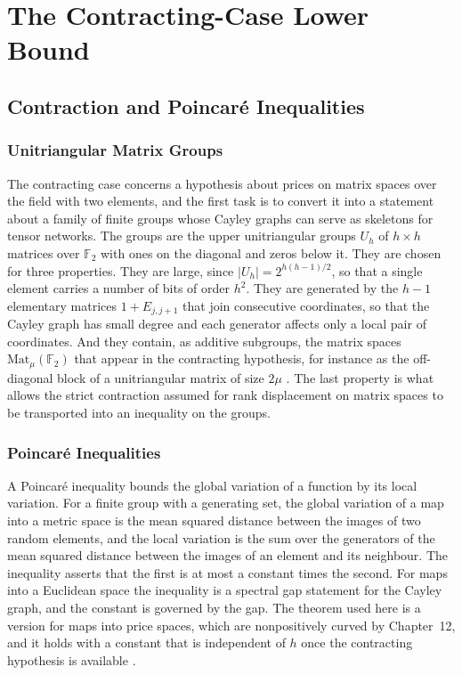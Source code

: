 \documentclass[11pt,letterpaper]{report}
\theoremstyle{plain}
\theoremstyle{definition}
\theoremstyle{remark}
\begin{document}
\part{The Contracting-Case Lower Bound}

\chapter{Contraction and Poincar\'e Inequalities}

\section{Unitriangular Matrix Groups}

The contracting case concerns a hypothesis about prices on matrix spaces over the field with two elements, and the first task is to convert it into a statement about a family of finite groups whose Cayley graphs can serve as skeletons for tensor networks. The groups are the upper unitriangular groups $U_h$ of $h\times h$ matrices over $\mathbb F_2$ with ones on the diagonal and zeros below it. They are chosen for three properties. They are large, since $|U_h|=2^{h(h-1)/2}$, so that a single element carries a number of bits of order $h^2$. They are generated by the $h-1$ elementary matrices $1+E_{j,j+1}$ that join consecutive coordinates, so that the Cayley graph has small degree and each generator affects only a local pair of coordinates. And they contain, as additive subgroups, the matrix spaces $\mathrm{Mat}_\mu(\mathbb F_2)$ that appear in the contracting hypothesis, for instance as the off-diagonal block of a unitriangular matrix of size $2\mu$ \cite{Source2026}. The last property is what allows the strict contraction assumed for rank displacement on matrix spaces to be transported into an inequality on the groups.

\section{Poincar\'e Inequalities}

A Poincar\'e inequality bounds the global variation of a function by its local variation. For a finite group with a generating set, the global variation of a map into a metric space is the mean squared distance between the images of two random elements, and the local variation is the sum over the generators of the mean squared distance between the images of an element and its neighbour. The inequality asserts that the first is at most a constant times the second. For maps into a Euclidean space the inequality is a spectral gap statement for the Cayley graph, and the constant is governed by the gap. The theorem used here is a version for maps into price spaces, which are nonpositively curved by Chapter~12, and it holds with a constant that is independent of $h$ once the contracting hypothesis is available \cite{Source2026}.
\end{document}
